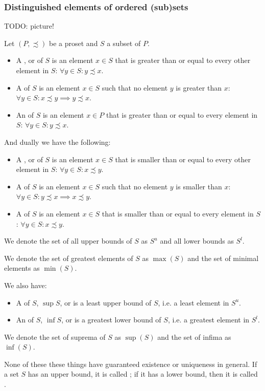 \subsubsection{Distinguished elements of ordered (sub)sets}
TODO: picture!
\begin{definition}
Let $(P,\precsim)$ be a proset and $S$ a subset of $P$.
\begin{itemize}
\item A ,  or  of $S$ is an element $x\in S$ that is greater than or equal to every other element in $S$: $\forall y\in S: y\precsim x$.
\item A  of $S$ is an element $x\in S$ such that no element $y$ is greater than $x$: $\forall y\in S: x\precsim y \implies y \precsim x$.
\item An  of $S$ is an element $x\in P$ that is greater than or equal to every element in $S$: $\forall y\in S: y\precsim x$.
\end{itemize}
And dually we have the following:
\begin{itemize}
\item A ,  or  of $S$ is an element $x\in S$ that is smaller than or equal to every other element in $S$: $\forall y\in S: x\precsim y$.
\item A  of $S$ is an element $x\in S$ such that no element $y$ is smaller than $x$: $\forall y\in S: y\precsim x \implies x \precsim y$.
\item A  of $S$ is an element $x\in S$ that is smaller than or equal to every element in $S$: $\forall y\in S: x\precsim y$.
\end{itemize}
We denote the set of all upper bounds of $S$ as $S^u$ and all lower bounds as $S^l$.

We denote the set of greatest elements of $S$ as $\max(S)$ and the set of minimal elements as $\min(S)$.

We also have:
\begin{itemize}
\item A  of $S$, $\sup S$, or  is a least upper bound of $S$, i.e. a least element in $S^u$.
\item An  of $S$, $\inf S$, or  is a greatest lower bound of $S$, i.e. a greatest element in $S^l$.
\end{itemize}
We denote the set of suprema of $S$ as $\sup(S)$ and the set of infima as $\inf(S)$.
\end{definition}
None of these these things have guaranteed existence or uniqueness in general. If a set $S$ has an upper bound, it is called ; if it has a lower bound, then it is called .

